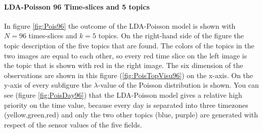 \documentclass[11pt,a4paper]{article}
\begin{document}
\paragraph{LDA-Poisson 96 Time-slices and 5 topics}
In figure \ref{fig:Pois96} the outcome of the LDA-Poisson model is shown with $N=96$ times-slices and $k=5$ topics. On the right-hand side of the figure the topic description of the five topics that are found. The colors of the topics in the two images are equal to each other, so every red time slice on the left image is the topic that is shown with red in the right image. The six dimension of the observations are shown in this figure (\ref{fig:PoisTopVisu96}) on the x-axis. On the y-axis of every subfigure the $\lambda$-value of the Poisson distribution is shown. You can see (figure \ref{fig:PoisDay96}) that the LDA-Poisson model gives a relative high priority on the time value, because every day is separated into three timezones (yellow,green,red) and only the two other topics (blue, purple) are generated with respect of the sensor values of the five fields.
\end{document}
